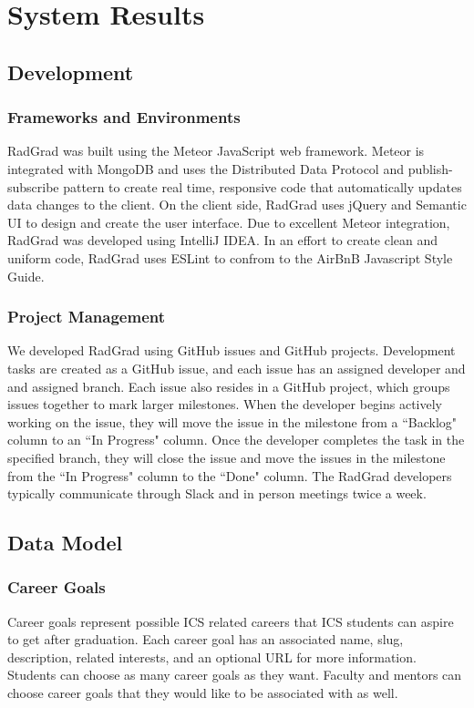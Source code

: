 \chapter{System Results}
\label{system-results}

\section{Development}
\subsection{Frameworks and Environments}
RadGrad was built using the Meteor JavaScript web framework. Meteor is integrated with MongoDB and uses the Distributed Data Protocol and publish-subscribe pattern to create real time, responsive code that automatically updates data changes to the client. On the client side, RadGrad uses jQuery and Semantic UI to design and create the user interface. Due to excellent Meteor integration, RadGrad was developed using IntelliJ IDEA. In an effort to create clean and uniform code, RadGrad uses ESLint to confrom to the AirBnB Javascript Style Guide. 

\subsection{Project Management}
We developed RadGrad using GitHub issues and GitHub projects. Development tasks are created as a GitHub issue, and each issue has an assigned developer and and assigned branch. Each issue also resides in a GitHub project, which groups issues together to mark larger milestones. When the developer begins actively working on the issue, they will move the issue in the milestone from a ``Backlog" column to an ``In Progress" column. Once the developer completes the task in the specified branch, they will close the issue and move the issues in the milestone from the ``In Progress" column to the ``Done" column. The RadGrad developers typically communicate through Slack and in person meetings twice a week. 

\section{Data Model}
\subsection{Career Goals}
Career goals represent possible ICS related careers that ICS students can aspire to get after graduation. Each career goal has an associated name, slug, description, related interests, and an optional URL for more information. Students can choose as many career goals as they want. Faculty and mentors can choose career goals that they would like to be associated with as well.  

